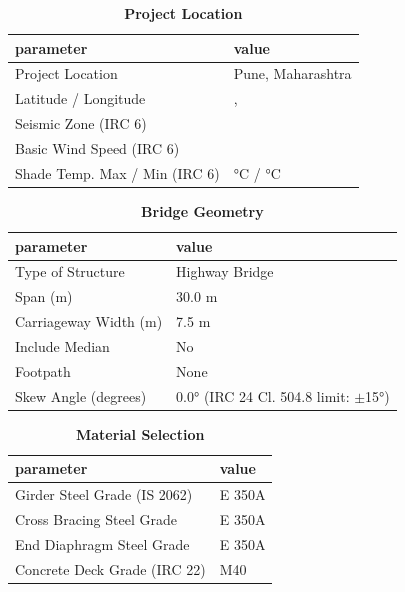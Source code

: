 \documentclass[12pt,a4paper]{report}
\numberwithin{table}{chapter}
\numberwithin{figure}{chapter}
\begin{document}
\begin{table}[H]
\caption{\textbf{Project Location}}
\label{subsec:project-location}
\begin{tabular}{|L{5.5cm}|L{8.5cm}|}
\hline
\textbf{parameter} & \textbf{value} \\
\hline
\textnormal{Project Location} & Pune, Maharashtra \\
\hline
\textnormal{Latitude / Longitude} & ,  \\
\hline
\textnormal{Seismic Zone (IRC 6)} &  \\
\hline
\textnormal{Basic Wind Speed (IRC 6)} &  \\
\hline
\textnormal{Shade Temp. Max / Min (IRC 6)} &  °C /  °C \\
\hline
\end{tabular}
\vspace{0.4cm}
\end{table}

\begin{table}[H]
\caption{\textbf{Bridge Geometry}}
\label{subsec:bridge-geometry}
\begin{tabular}{|L{5.5cm}|L{8.5cm}|}
\hline
\textbf{parameter} & \textbf{value} \\
\hline
\textnormal{Type of Structure} & Highway Bridge \\
\hline
\textnormal{Span (m)} & 30.0 m \\
\hline
\textnormal{Carriageway Width (m)} & 7.5 m \\
\hline
\textnormal{Include Median} & No \\
\hline
\textnormal{Footpath} & None \\
\hline
\textnormal{Skew Angle (degrees)} & 0.0° (IRC 24 Cl. 504.8 limit: $\pm$15°) \\
\hline
\end{tabular}
\end{table}
\vspace{0.4cm}

\begin{table}[H]
\caption{\textbf{Material Selection}}
\label{subsec:material}
\begin{tabular}{|L{5.5cm}|L{8.5cm}|}
\hline
\textbf{parameter} & \textbf{value} \\
\hline
\textnormal{Girder Steel Grade (IS 2062)} & E 350A \\
\hline
\textnormal{Cross Bracing Steel Grade} & E 350A \\
\hline
\textnormal{End Diaphragm Steel Grade} & E 350A \\
\hline
\textnormal{Concrete Deck Grade (IRC 22)} & M40 \\
\hline
\end{tabular}
\end{table}
\vspace{0.4cm}
\end{document}
